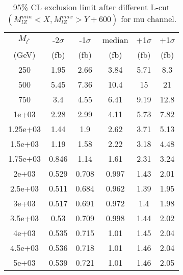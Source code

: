 \documentclass[]{article}
\begin{document}
\begin{table}
\begin{center}
\begin{tabular}{cccccc}
\hline 
\hline 
$M_{l^*}$ & -2$\sigma$ & -1$\sigma$ & median & +1$\sigma$ & +1$\sigma$\\ 
(GeV) & (fb) & (fb) & (fb) & (fb) & (fb)  \\ 
\hline 
\hline 
250 & 1.95 & 2.66 & 3.84 & 5.71 & 8.3\\
500 & 5.45 & 7.36 & 10.4 & 15 & 21\\
750 & 3.4 & 4.55 & 6.41 & 9.19 & 12.8\\
1e+03 & 2.28 & 2.99 & 4.11 & 5.73 & 7.82\\
1.25e+03 & 1.44 & 1.9 & 2.62 & 3.71 & 5.13\\
1.5e+03 & 1.19 & 1.58 & 2.22 & 3.18 & 4.48\\
1.75e+03 & 0.846 & 1.14 & 1.61 & 2.31 & 3.24\\
2e+03 & 0.529 & 0.708 & 0.997 & 1.43 & 2.01\\
2.5e+03 & 0.511 & 0.684 & 0.962 & 1.39 & 1.95\\
3e+03 & 0.517 & 0.691 & 0.972 & 1.4 & 1.98\\
3.5e+03 & 0.53 & 0.709 & 0.998 & 1.44 & 2.02\\
4e+03 & 0.535 & 0.715 & 1.01 & 1.45 & 2.04\\
4.5e+03 & 0.536 & 0.718 & 1.01 & 1.46 & 2.04\\
5e+03 & 0.539 & 0.721 & 1.01 & 1.46 & 2.05\\
\hline 
\end{tabular}
\caption{95\% CL exclusion limit after different L-cut $(M_{lZ}^{min} < X, M_{lZ}^{max} > Y + 600)$ for mu channel.}
\label{tab:limit_muon}
\end{center}
\end{table}
\end{document}
